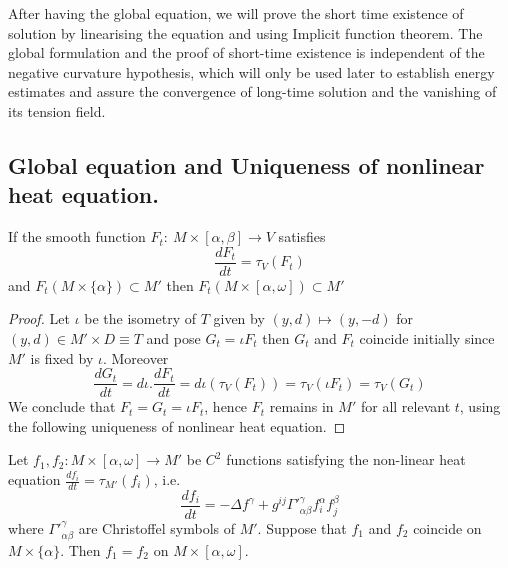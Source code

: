 After having the global equation, we will prove the short time existence of solution by
linearising the equation and using Implicit function theorem. The global formulation and the
proof of short-time existence is independent of the negative curvature hypothesis, which
will only be used later to establish energy estimates and assure the convergence of
long-time solution and the vanishing of its tension field.


\subsection{Global equation and Uniqueness of nonlinear heat equation.}
\label{sec:orgf2de8fe}
\begin{theorem}
\label{thm:global-eq}
If the smooth function \(F_t:\ M\times [\alpha,\beta] \longrightarrow V\) satisfies
\begin{equation}
\label{eq:global-heat}
\frac{d F_t}{dt} = \tau_V(F_t)
\end{equation}
and \(F_t(M\times \{\alpha\}) \subset M'\) then \(F_t(M\times[\alpha,\omega])\subset M'\)
\end{theorem}
\begin{proof}
Let \(\iota\) be the isometry of \(T\) given by \((y,d)\mapsto (y,-d)\) for \((y,d)\in M'\times D \equiv T\) 
and pose \(G_t= \iota F_t\) then \(G_t\) and \(F_t\) coincide initially since \(M'\) is
fixed by \(\iota\). Moreover
\[
\frac{d G_t}{d t} = d\iota . \frac{d F_t}{d t} = d\iota (\tau_V(F_t)) = \tau_V(\iota F_t)=\tau_V(G_t)
\]
We conclude that \(F_t = G_t = \iota F_t\), hence \(F_t\) remains in \(M'\) for all
relevant \(t\), using the following uniqueness of nonlinear heat equation.
\end{proof}

\begin{theorem}
\label{thm:unique-nonlinear-heat}
Let \(f_1,f_2: M\times [\alpha,\omega] \longrightarrow M'\) be \(C^2\)
functions satisfying the non-linear heat equation
\(\frac{d f_i}{d t} = \tau_{M'}(f_i)\), i.e.
\[
 \frac{d f_i}{d t} =-\Delta f^\gamma +g^{ij}\Gamma'^{\gamma}_{\alpha\beta} f^{\alpha}_{i}f^{\beta}_{j}
\]
where \(\Gamma'^\gamma_{\alpha\beta}\) are Christoffel symbols of \(M'\). Suppose that
\(f_1\) and \(f_2\) coincide on \(M\times \{\alpha\}\). Then \(f_1=f_2\) on \(M\times[\alpha,\omega]\).
\end{theorem}

